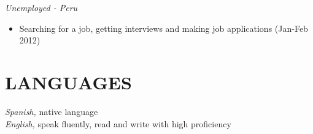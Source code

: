 \documentclass[margin]{res}
\begin{document}
\begin{resume}
{\sl Unemployed - Peru
} \hfill 
\begin{itemize}
\item Searching for a job, getting interviews and making job applications (Jan-Feb 2012)
\end{itemize}
%   
\section{LANGUAGES}
{\sl Spanish,} native language\\
{\sl English,} speak fluently, read and write with high proficiency

% 


\end{resume}
\end{document}
